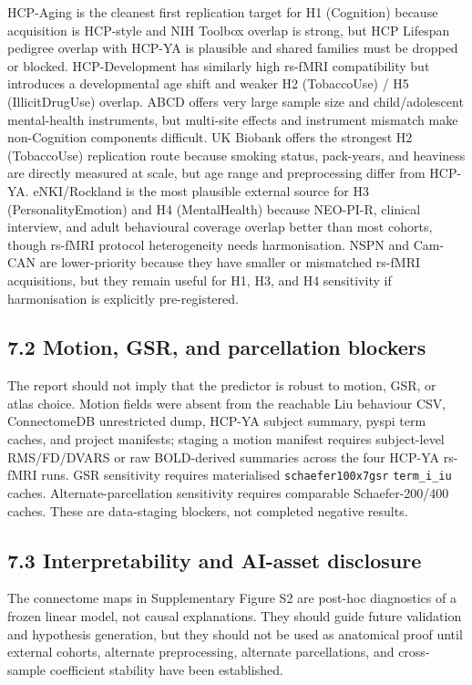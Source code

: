 \documentclass[11pt,letterpaper]{report}
\begin{document}
HCP-Aging is the cleanest first replication target for H1 (Cognition) because acquisition is HCP-style and NIH Toolbox overlap is strong, but HCP Lifespan pedigree overlap with HCP-YA is plausible and shared families must be dropped or blocked. HCP-Development has similarly high rs-fMRI compatibility but introduces a developmental age shift and weaker H2 (TobaccoUse) / H5 (IllicitDrugUse) overlap. ABCD offers very large sample size and child/adolescent mental-health instruments, but multi-site effects and instrument mismatch make non-Cognition components difficult. UK Biobank offers the strongest H2 (TobaccoUse) replication route because smoking status, pack-years, and heaviness are directly measured at scale, but age range and preprocessing differ from HCP-YA. eNKI/Rockland is the most plausible external source for H3 (PersonalityEmotion) and H4 (MentalHealth) because NEO-PI-R, clinical interview, and adult behavioural coverage overlap better than most cohorts, though rs-fMRI protocol heterogeneity needs harmonisation. NSPN and Cam-CAN are lower-priority because they have smaller or mismatched rs-fMRI acquisitions, but they remain useful for H1, H3, and H4 sensitivity if harmonisation is explicitly pre-registered.

\subsection*{7.2 Motion, GSR, and parcellation blockers}

The report should not imply that the predictor is robust to motion, GSR, or atlas choice. Motion fields were absent from the reachable Liu behaviour CSV, ConnectomeDB unrestricted dump, HCP-YA subject summary, pyspi term caches, and project manifests; staging a motion manifest requires subject-level RMS/FD/DVARS or raw BOLD-derived summaries across the four HCP-YA rs-fMRI runs. GSR sensitivity requires materialised \texttt{schaefer100x7gsr} \texttt{term\_i\_iu} caches. Alternate-parcellation sensitivity requires comparable Schaefer-200/400 caches. These are data-staging blockers, not completed negative results.

\subsection*{7.3 Interpretability and AI-asset disclosure}

The connectome maps in Supplementary Figure S2 are post-hoc diagnostics of a frozen linear model, not causal explanations. They should guide future validation and hypothesis generation, but they should not be used as anatomical proof until external cohorts, alternate preprocessing, alternate parcellations, and cross-sample coefficient stability have been established.
\end{document}
